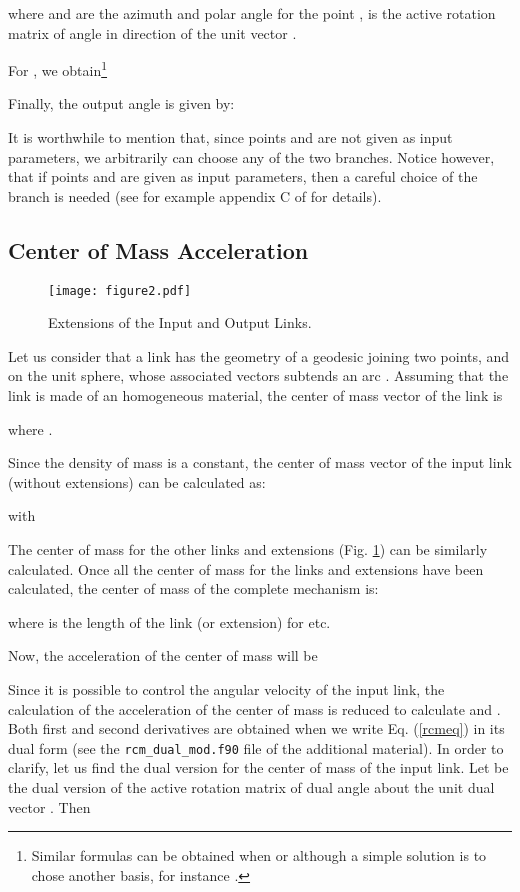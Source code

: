 \documentclass[11pt]{article}
\begin{document}
where  and  are the azimuth and polar angle for the 
point ,  is the active 
rotation matrix of angle  in direction of the unit vector 
.



For , we obtain\footnote{Similar formulas can be 
obtained when  or  although a simple solution 
is to chose another basis, for instance .}



 

Finally, the output angle  is given by:

It is worthwhile to mention that, since points 
 and  are not given as input parameters, we 
arbitrarily can choose any of the two branches. Notice however, that if 
points  and  are given as input parameters, 
then a careful choice of the branch is needed (see for example appendix 
C of \cite{Cervantes2009} for details).

\subsection{Center of Mass Acceleration}
\begin{figure}[htb]
\begin{center}
\texttt{[image: figure2.pdf]} 
\caption{Extensions of the Input and Output Links.}
\label{figure2}
\end{center}
\end{figure}
Let us consider that a link has the geometry of a geodesic joining two 
points,  and  on the unit sphere, whose 
associated vectors subtends an arc . Assuming that the link is 
made of an homogeneous material, the center of mass vector of the link 
is

where .

Since the density of mass is a constant, the center of mass vector of 
the input link (without extensions) can be calculated as:

with 


The center of mass for the other links and extensions (Fig. 
\ref{figure2}) can be similarly calculated. Once all the center of mass 
for the links and extensions have been calculated, the center of mass of 
the complete mechanism is:

where  is the length of the  link (or extension) for  etc. 

Now, the acceleration of the center of mass will be

Since it is possible to control the angular velocity of the input link, 
the calculation of the acceleration of the center of mass is reduced to 
calculate  and 
. Both first and second 
derivatives are obtained when we write Eq. (\ref{rcmeq}) in its dual 
form (see the \verb+rcm_dual_mod.f90+ file of the additional material).
In order to clarify, let us find the dual version for the center of mass
of the input link. Let  be the dual version of the
active rotation matrix of dual angle  about the unit 
dual vector .
Then
\end{document}
